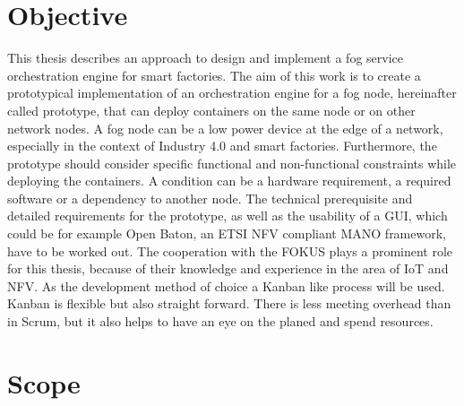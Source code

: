 \section{Objective}



This thesis describes an approach to design and implement a fog service orchestration engine for smart factories.
The aim of this work is to create a prototypical implementation of an orchestration engine for a fog node, hereinafter called prototype, that can deploy containers on the same node or on other network nodes.
A fog node can be a low power device at the edge of a network, especially in the context of Industry 4.0 and smart factories.
Furthermore, the prototype should consider specific functional and non-functional constraints while deploying the containers.
A condition can be a hardware requirement, a required software or a dependency to another node.
The technical prerequisite and detailed requirements for the prototype, as well as the usability of a \ac{GUI}, which could be for example Open Baton, an \ac{ETSI} \ac{NFV} compliant \ac{MANO} framework, have to be worked out.
The cooperation with the \acf{FOKUS} plays a prominent role for this thesis, because of their knowledge and experience in the area of \ac{IoT} and \ac{NFV}.
As the development method of choice a Kanban like process will be used.
Kanban is flexible but also straight forward.
There is less meeting overhead than in Scrum, but it also helps to have an eye on the planed and spend resources.


\section{Scope}

